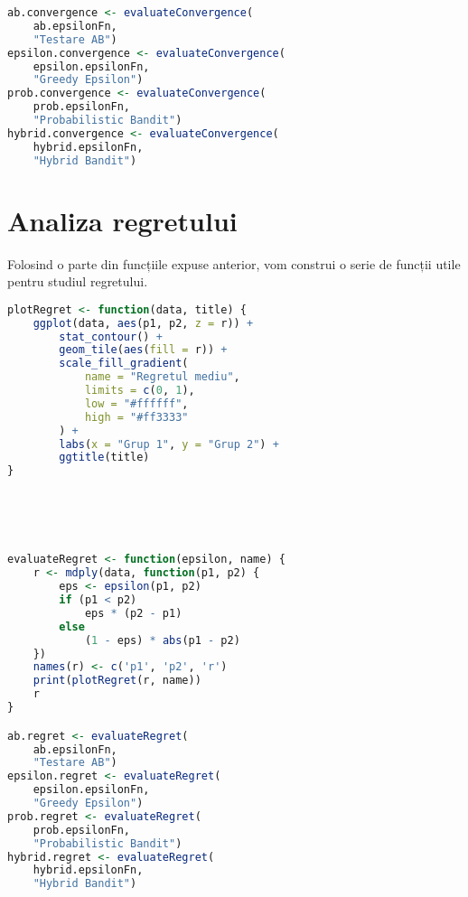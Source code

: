 \begin{appendices}
\begin{center}
\begin{lstlisting}[language=r]
ab.convergence <- evaluateConvergence(
	ab.epsilonFn, 
	"Testare AB")
epsilon.convergence <- evaluateConvergence(
	epsilon.epsilonFn, 
	"Greedy Epsilon")
prob.convergence <- evaluateConvergence(
	prob.epsilonFn, 
	"Probabilistic Bandit")
hybrid.convergence <- evaluateConvergence(
	hybrid.epsilonFn, 
	"Hybrid Bandit")
	\end{lstlisting}
\end{center}

\section{Analiza regretului}

Folosind o parte din funcțiile expuse anterior, vom construi o serie de funcții utile pentru studiul regretului.

\begin{center}
	\begin{lstlisting}[language=r]
plotRegret <- function(data, title) {
	ggplot(data, aes(p1, p2, z = r)) +  
		stat_contour() + 
		geom_tile(aes(fill = r)) + 
		scale_fill_gradient(
			name = "Regretul mediu",
			limits = c(0, 1),
			low = "#ffffff",
			high = "#ff3333"
		) +
		labs(x = "Grup 1", y = "Grup 2") +		
		ggtitle(title)
}





evaluateRegret <- function(epsilon, name) {
	r <- mdply(data, function(p1, p2) {
		eps <- epsilon(p1, p2)
		if (p1 < p2) 
			eps * (p2 - p1) 
		else 
			(1 - eps) * abs(p1 - p2)
	})
	names(r) <- c('p1', 'p2', 'r')
	print(plotRegret(r, name))
	r
}

ab.regret <- evaluateRegret(
	ab.epsilonFn, 
	"Testare AB")
epsilon.regret <- evaluateRegret(
	epsilon.epsilonFn, 
	"Greedy Epsilon")
prob.regret <- evaluateRegret(
	prob.epsilonFn, 
	"Probabilistic Bandit")
hybrid.regret <- evaluateRegret(
	hybrid.epsilonFn, 
	"Hybrid Bandit")

	\end{lstlisting}
\end{center}

\end{appendices}

